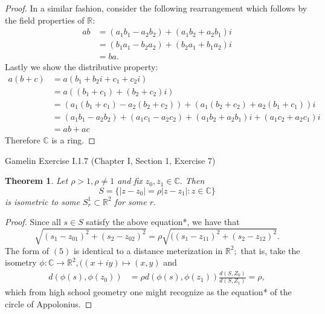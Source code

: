 \documentclass[letter]{article}
\newtheorem{theorem}{Theorem}
\newenvironment{menumerate}{%
  \edef\backupindent{\the\parindent}%
  \enumerate%
  \setlength{\parindent}{\backupindent}%
}{\endenumerate}
\begin{document}
\begin{menumerate}
\begin{proof}
        In a similar fashion, consider the following rearrangement which follows by the field 
        properties of $\mathbb{R}$:
        \begin{equation*}
            \begin{aligned}
                ab &= (a_1b_1 - a_2b_2) + (a_1b_2 +a_2b_1)i \\
                &= (b_1a_1 - b_2a_2) + (b_2a_1 + b_1a_2)i \\
                &= ba.          
            \end{aligned}
        \end{equation*}
        Lastly we show the distributive property: 
        \begin{equation*}
            \begin{aligned}
                a(b+c) &= a(b_1+b_2i + c_1 + c_2i) \\
                &= a((b_1+c_1) + (b_2+c_2)i) \\
                &= (a_1(b_1+c_1) - a_2(b_2+c_2)) + (a_1(b_2+c_2) + a_2(b_1+c_1))i \\
                &= (a_1b_1 - a_2b_2)  + (a_1c_1 - a_2c_2) + (a_1b_2 + a_2b_1 )i + (a_1c_2 + a_2c_1)i   \\         
                &= ab + ac
            \end{aligned}
        \end{equation*}
        Therefore $\mathbb{C}$ is a ring.
    \end{proof}


    \item Gamelin Exercise I.1.7 (Chapter I, Section 1, Exercise 7)  
    \begin{theorem}
        Let $\rho >1, \rho \neq 1$ and fix $z_0, z_1 \in \mathbb{C}.$ Then 
        $$S = \{|z-z_0| = \rho |z-z_1| : z \in \mathbb{C}\}$$ 
        is isometric to some $S^1_r \subset \mathbb{R}^2$ for some $r.$
    \end{theorem}
    \begin{proof}
        Since all $s \in S$ satisfy the above equation*, we have that 
        \begin{equation*}
            \sqrt{(s_1 - z_{01})^2 + (s_2 - z_{02})^2} = 
            \rho\sqrt{((s_1 - z_{11})^2 + (s_2 - z_{12})^2}.   
        \end{equation*}
        The form of $(5)$ is identical to a distance meterization in $\mathbb{R}^2;$
        that is, take the isometry $\phi : \mathbb{C} \to \mathbb{R}^2, ((x + iy) \mapsto (x,y)$ and
        \begin{equation*}
            \begin{aligned}
                d(\phi(s),\phi(z_0)) &= \rho d(\phi(s), \phi(z_1))
                    \frac{d(S,Z_0)}{d(S,Z_1)} = \rho,
            \end{aligned}
        \end{equation*}
        which from high school geometry one might recognize as the equation* of the circle
        of Appolonius. 
    \end{proof}


\end{menumerate}
\end{document}
